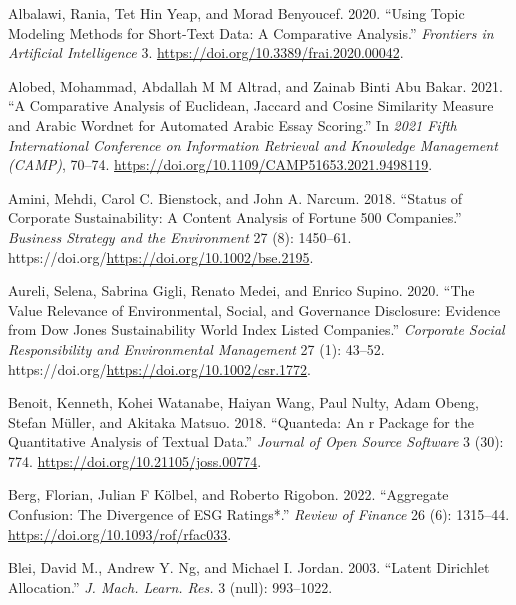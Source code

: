 \documentclass[
]{article}
\newlength{\cslhangindent}
\newlength{\cslentryspacingunit} %
\newenvironment{CSLReferences}[2] %
 {%
  \setlength{\parindent}{0pt}
  \ifodd #1
  \let\oldpar\par
  \def\par{\hangindent=\cslhangindent\oldpar}
  \fi
  \setlength{\parskip}{#2\cslentryspacingunit}
 }%
 {}
\begin{document}
\hypertarget{refs}{}
\begin{CSLReferences}{1}{0}
\leavevmode{}%
Albalawi, Rania, Tet Hin Yeap, and Morad Benyoucef. 2020. {``Using Topic Modeling Methods for Short-Text Data: A Comparative Analysis.''} \emph{Frontiers in Artificial Intelligence} 3. \url{https://doi.org/10.3389/frai.2020.00042}.

\leavevmode{}%
Alobed, Mohammad, Abdallah M M Altrad, and Zainab Binti Abu Bakar. 2021. {``A Comparative Analysis of Euclidean, Jaccard and Cosine Similarity Measure and Arabic Wordnet for Automated Arabic Essay Scoring.''} In \emph{2021 Fifth International Conference on Information Retrieval and Knowledge Management (CAMP)}, 70--74. \url{https://doi.org/10.1109/CAMP51653.2021.9498119}.

\leavevmode{}%
Amini, Mehdi, Carol C. Bienstock, and John A. Narcum. 2018. {``Status of Corporate Sustainability: A Content Analysis of Fortune 500 Companies.''} \emph{Business Strategy and the Environment} 27 (8): 1450--61. https://doi.org/\url{https://doi.org/10.1002/bse.2195}.

\leavevmode{}%
Aureli, Selena, Sabrina Gigli, Renato Medei, and Enrico Supino. 2020. {``The Value Relevance of Environmental, Social, and Governance Disclosure: Evidence from Dow Jones Sustainability World Index Listed Companies.''} \emph{Corporate Social Responsibility and Environmental Management} 27 (1): 43--52. https://doi.org/\url{https://doi.org/10.1002/csr.1772}.

\leavevmode{}%
Benoit, Kenneth, Kohei Watanabe, Haiyan Wang, Paul Nulty, Adam Obeng, Stefan Müller, and Akitaka Matsuo. 2018. {``Quanteda: An r Package for the Quantitative Analysis of Textual Data.''} \emph{Journal of Open Source Software} 3 (30): 774. \url{https://doi.org/10.21105/joss.00774}.

\leavevmode{}%
Berg, Florian, Julian F Kölbel, and Roberto Rigobon. 2022. {``{Aggregate Confusion: The Divergence of ESG Ratings*}.''} \emph{Review of Finance} 26 (6): 1315--44. \url{https://doi.org/10.1093/rof/rfac033}.

\leavevmode{}%
Blei, David M., Andrew Y. Ng, and Michael I. Jordan. 2003. {``Latent Dirichlet Allocation.''} \emph{J. Mach. Learn. Res.} 3 (null): 993--1022.


\end{CSLReferences}
\end{document}
